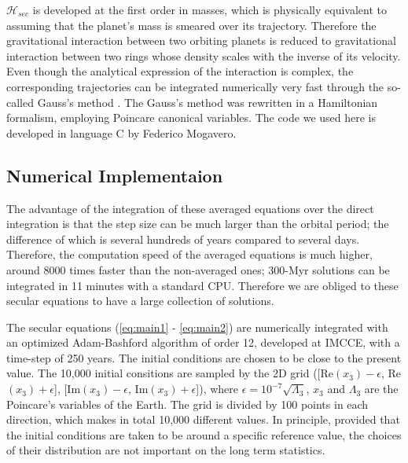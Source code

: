 \documentclass[12pt]{article}
\begin{document}
	$\mathcal{H}_{sec}$ is developed at the first order in masses, which is physically equivalent to assuming that the planet's mass is smeared over its trajectory. Therefore the gravitational interaction between two orbiting planets is reduced to gravitational interaction between two rings whose density scales with the inverse of its velocity. Even though the analytical expression of the interaction is complex, the corresponding trajectories can be integrated numerically very fast through the so-called Gauss’s method \citep{gauss1818}. The Gauss's method was rewritten in a Hamiltonian formalism, employing Poincare canonical variables. The code we used here is developed in language C by Federico Mogavero.
	
	\subsection{Numerical Implementaion}
	The advantage of the integration of these averaged equations over the direct integration is that the step size can be much larger than the orbital period; the difference of which is several hundreds of years compared to several days. Therefore, the computation speed of the averaged equations is much higher, around 8000 times faster than the non-averaged ones; 300-Myr solutions can be integrated in 11 minutes with a standard CPU. Therefore we are obliged to these secular equations to have a large collection of solutions. 
	
	The secular equations (\ref{eq:main1} - \ref{eq:main2})  are numerically integrated with an optimized Adam-Bashford algorithm of order 12, developed at IMCCE, with a time-step of 250 years. The initial conditions are chosen to be close to the present value. The 10,000 initial consitions are sampled by the 2D grid ([Re$(x_3) - \epsilon$, Re$(x_3) + \epsilon$], [Im$(x_3) - \epsilon$, Im$(x_3) + \epsilon$]), where $ \epsilon = 10^{-7} \sqrt{\Lambda_3} $, $x_3$ and $\Lambda_3$ are the Poincare's variables of the Earth. The grid is divided by 100 points in each direction, which makes in total 10,000 different values. In principle, provided that the initial conditions are taken to be around a specific reference value, the choices of their distribution  are not important on the long term statistics. 
	
\end{document}
